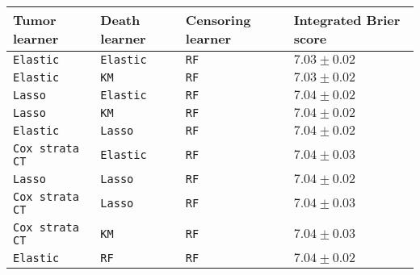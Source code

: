 \begin{tabular}{lll|l}
  \toprule
Tumor learner & Death learner & Censoring learner & Integrated Brier score \\ 
  \midrule
\texttt{Elastic} & \texttt{Elastic} & \texttt{RF} & $7.03\pm0.02$ \\ 
  \texttt{Elastic} & \texttt{KM} & \texttt{RF} & $7.03\pm0.02$ \\ 
  \texttt{Lasso} & \texttt{Elastic} & \texttt{RF} & $7.04\pm0.02$ \\ 
  \texttt{Lasso} & \texttt{KM} & \texttt{RF} & $7.04\pm0.02$ \\ 
  \texttt{Elastic} & \texttt{Lasso} & \texttt{RF} & $7.04\pm0.02$ \\ 
  \texttt{Cox strata CT} & \texttt{Elastic} & \texttt{RF} & $7.04\pm0.03$ \\ 
  \texttt{Lasso} & \texttt{Lasso} & \texttt{RF} & $7.04\pm0.02$ \\ 
  \texttt{Cox strata CT} & \texttt{Lasso} & \texttt{RF} & $7.04\pm0.03$ \\ 
  \texttt{Cox strata CT} & \texttt{KM} & \texttt{RF} & $7.04\pm0.03$ \\ 
  \texttt{Elastic} & \texttt{RF} & \texttt{RF} & $7.04\pm0.02$ \\ 
   \bottomrule
\end{tabular}

